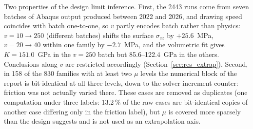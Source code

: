 Two properties of the design limit inference. First, the 2443 runs come from seven batches of Abaqus output produced between 2022 and 2026, and drawing speed coincides with batch one-to-one, so $v$ partly encodes batch rather than physics: %
$v = 10 \to 250$ (different batches) shifts the surface $\sigma_{zz}$ by $+25.6$~MPa, $v = 20 \to 40$ within one family by $-2.7$~MPa, and the volumetric fit gives $K = 151.0$~GPa in the $v=250$ batch but 85.6--122.4~GPa in the others. %
Conclusions along $v$ are restricted accordingly (Section~\ref{sec:res_extrap}). %
Second, in 158 of the 830 families with at least two $\mu$ levels the numerical block of the report is bit-identical at all three levels, down to the solver increment counter: friction was not actually varied there. %
These cases are removed as duplicates (one computation under three labels: 13.2\,\% of the raw cases are bit-identical copies of another case differing only in the friction label), but $\mu$ is covered more sparsely than the design suggests and is not used as an extrapolation axis. %


